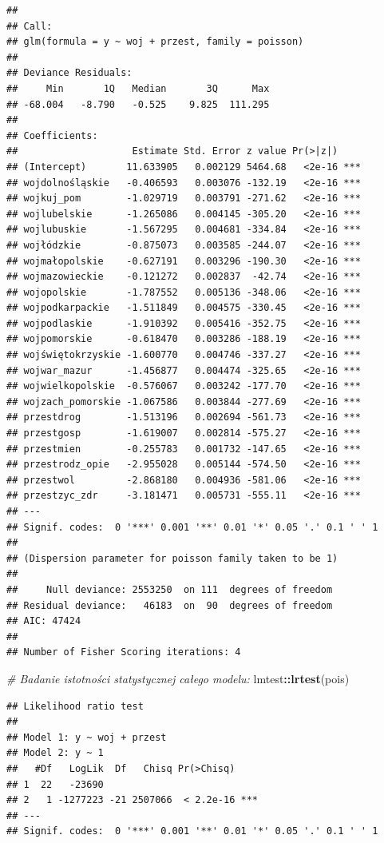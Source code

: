 \documentclass[polish,]{book}
\newenvironment{Shaded}{\begin{snugshade}}{\end{snugshade}}
\newcommand{\CommentTok}[1]{\textcolor[rgb]{0.56,0.35,0.01}{\textit{#1}}}
\newcommand{\KeywordTok}[1]{\textcolor[rgb]{0.13,0.29,0.53}{\textbf{#1}}}
\newcommand{\NormalTok}[1]{#1}
\newcommand{\OperatorTok}[1]{\textcolor[rgb]{0.81,0.36,0.00}{\textbf{#1}}}
\begin{document}
\begin{verbatim}
## 
## Call:
## glm(formula = y ~ woj + przest, family = poisson)
## 
## Deviance Residuals: 
##     Min       1Q   Median       3Q      Max  
## -68.004   -8.790   -0.525    9.825  111.295  
## 
## Coefficients:
##                    Estimate Std. Error z value Pr(>|z|)    
## (Intercept)       11.633905   0.002129 5464.68   <2e-16 ***
## wojdolnośląskie   -0.406593   0.003076 -132.19   <2e-16 ***
## wojkuj_pom        -1.029719   0.003791 -271.62   <2e-16 ***
## wojlubelskie      -1.265086   0.004145 -305.20   <2e-16 ***
## wojlubuskie       -1.567295   0.004681 -334.84   <2e-16 ***
## wojłódzkie        -0.875073   0.003585 -244.07   <2e-16 ***
## wojmałopolskie    -0.627191   0.003296 -190.30   <2e-16 ***
## wojmazowieckie    -0.121272   0.002837  -42.74   <2e-16 ***
## wojopolskie       -1.787552   0.005136 -348.06   <2e-16 ***
## wojpodkarpackie   -1.511849   0.004575 -330.45   <2e-16 ***
## wojpodlaskie      -1.910392   0.005416 -352.75   <2e-16 ***
## wojpomorskie      -0.618470   0.003286 -188.19   <2e-16 ***
## wojświętokrzyskie -1.600770   0.004746 -337.27   <2e-16 ***
## wojwar_mazur      -1.456877   0.004474 -325.65   <2e-16 ***
## wojwielkopolskie  -0.576067   0.003242 -177.70   <2e-16 ***
## wojzach_pomorskie -1.067586   0.003844 -277.69   <2e-16 ***
## przestdrog        -1.513196   0.002694 -561.73   <2e-16 ***
## przestgosp        -1.619007   0.002814 -575.27   <2e-16 ***
## przestmien        -0.255783   0.001732 -147.65   <2e-16 ***
## przestrodz_opie   -2.955028   0.005144 -574.50   <2e-16 ***
## przestwol         -2.868180   0.004936 -581.06   <2e-16 ***
## przestzyc_zdr     -3.181471   0.005731 -555.11   <2e-16 ***
## ---
## Signif. codes:  0 '***' 0.001 '**' 0.01 '*' 0.05 '.' 0.1 ' ' 1
## 
## (Dispersion parameter for poisson family taken to be 1)
## 
##     Null deviance: 2553250  on 111  degrees of freedom
## Residual deviance:   46183  on  90  degrees of freedom
## AIC: 47424
## 
## Number of Fisher Scoring iterations: 4
\end{verbatim}

\begin{Shaded}
\begin{Highlighting}[]
\CommentTok{# Badanie istotności statystycznej całego modelu:}
\NormalTok{lmtest}\OperatorTok{::}\KeywordTok{lrtest}\NormalTok{(pois)}
\end{Highlighting}
\end{Shaded}

\begin{verbatim}
## Likelihood ratio test
## 
## Model 1: y ~ woj + przest
## Model 2: y ~ 1
##   #Df   LogLik  Df   Chisq Pr(>Chisq)    
## 1  22   -23690                           
## 2   1 -1277223 -21 2507066  < 2.2e-16 ***
## ---
## Signif. codes:  0 '***' 0.001 '**' 0.01 '*' 0.05 '.' 0.1 ' ' 1
\end{verbatim}
\end{document}

